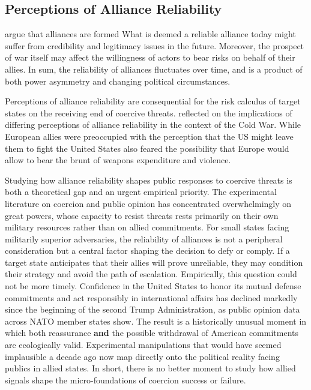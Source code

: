 \subsection{Perceptions of Alliance Reliability}
\textcite{johnson_alliance_2023} argue that alliances are formed  What is deemed a reliable alliance today might suffer from credibility and legitimacy issues in the future. Moreover, the prospect of war itself may affect the willingness of actors to bear risks on behalf of their allies. In sum, the reliability of alliances fluctuates over time, and is a product of both power asymmetry and changing political circumstances. \autocite{leeds_reliability_2003, gartzke_why_2004} 

Perceptions of alliance reliability are consequential for the risk calculus of target states on the receiving end of coercive threats. \textcite{schelling_arms_1966} reflected on the implications of differing perceptions of alliance reliability in the context of the Cold War. While European allies were preoccupied with the perception that the US might leave them to fight  the United States also feared the possibility that Europe would allow  to bear the brunt of weapons expenditure and violence.\autocite{schelling_arms_1966}


Studying how alliance reliability shapes public responses to coercive threats is both a theoretical gap and an urgent empirical priority. The experimental literature on coercion and public opinion has concentrated overwhelmingly on great powers, whose capacity to resist threats rests primarily on their own military resources rather than on allied commitments. For small states facing militarily superior adversaries, the reliability of alliances is not a peripheral consideration but a central factor shaping the decision to defy or comply. If a target state anticipates that their allies will prove unreliable, they may condition their strategy and avoid the path of escalation. Empirically, this question could not be more timely. Confidence in the United States to honor its mutual defense commitments and act responsibly in international affairs has declined markedly since the beginning of the second Trump Administration, as public opinion data across NATO member states show.\autocite{wike_us_2025} The result is a historically unusual moment in which both reassurance \textbf{and} the possible withdrawal of American commitments are ecologically valid. Experimental manipulations that would have seemed implausible a decade ago now map directly onto the political reality facing publics in allied states. In short, there is no better moment to study how allied signals shape the micro-foundations of coercion success or failure.

